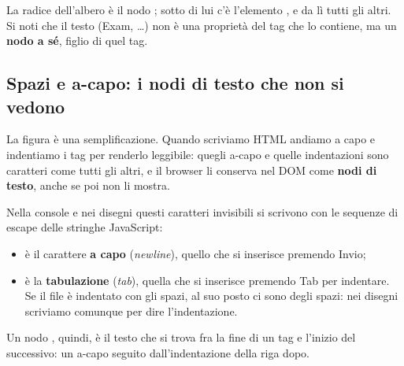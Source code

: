 La radice dell'albero è il nodo ; sotto di lui c'è l'elemento
, e da lì tutti gli altri. Si noti che il testo (\guillemotleft Exam\guillemotright,
\guillemotright\ldots) non è una proprietà del tag che lo
contiene, ma un \textbf{nodo a sé}, figlio di quel tag.

\subsection{Spazi e a-capo: i nodi di testo che non si vedono}

La figura è una semplificazione. Quando scriviamo HTML andiamo a capo e
indentiamo i tag per renderlo leggibile: quegli a-capo e quelle indentazioni sono
caratteri come tutti gli altri, e il browser li conserva nel DOM come
\textbf{nodi di testo}, anche se poi non li mostra.

Nella console e nei disegni questi caratteri invisibili si scrivono con le
sequenze di escape delle stringhe JavaScript:

\begin{itemize}
  \item {} è il carattere \textbf{a capo}
        (\textit{newline}), quello che si inserisce premendo Invio;
  \item {} è la \textbf{tabulazione} (\textit{tab}), quella
        che si inserisce premendo Tab per indentare. Se il file è indentato con
        gli spazi, al suo posto ci sono degli spazi: nei disegni scriviamo
        comunque  per dire \guillemotleft l'indentazione\guillemotright.
\end{itemize}

Un nodo , quindi, è il testo che
si trova fra la fine di un tag e l'inizio del successivo: un a-capo seguito
dall'indentazione della riga dopo.

